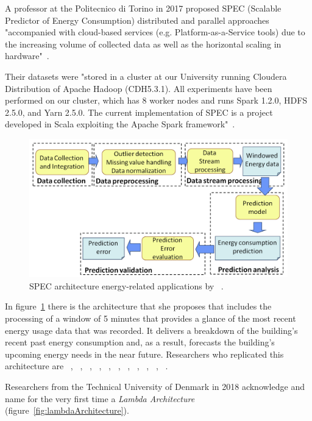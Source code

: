 \documentclass[a4paper,12pt,twoside]{ThesisStyle}
\begin{document}
A professor at the Politecnico di Torino in 2017 proposed SPEC (Scalable Predictor of Energy Consumption) distributed and parallel approaches "accompanied with cloud-based services (e.g. Platform-as-a-Service tools) due to the increasing volume of collected data as well as the horizontal scaling in hardware"~\cite{cerquitelli2017predicting}. 

Their datasets were "stored in a cluster at our University running Cloudera Distribution of Apache Hadoop (CDH5.3.1). All experiments have been performed on our cluster, which has 8 worker nodes and runs Spark 1.2.0, HDFS 2.5.0, and Yarn 2.5.0. The current implementation of SPEC is a project developed in Scala exploiting the Apache Spark framework"~\cite{cerquitelli2017predicting}. 

\begin{figure}[]
\centering
\includegraphics[width=13 cm]{imatges/SPECarchitecture.png}
\caption{\label{fig:SPECarchitecture} SPEC architecture energy-related applications by ~\cite{cerquitelli2017predicting}.}
\end{figure}

In figure~\ref{fig:SPECarchitecture} there is the architecture that she proposes that includes the processing of a window of 5 minutes that provides a glance of the most recent energy usage data that was recorded. It delivers a breakdown of the building's recent past energy consumption and, as a result, forecasts the building's upcoming energy needs in the near future. Researchers who replicated this architecture are ~\cite{Wang2017Taxis}, ~\cite{liu2018scalable}, ~\cite{bangui2021hybrid}, ~\cite{leiria2021using}, ~\cite{abd2022analyze}, ~\cite{ali2020data}, ~\cite{hangan2022advanced}, ~\cite{saheed2022machine}, ~\cite{bukhari2023anomaly}, ~\cite{yadav2023augmentation}, ~\cite{wu2023gtfs}.

Researchers from the Technical University of Denmark in 2018 acknowledge and name for the very first time a \textit{Lambda Architecture} (figure~\ref{fig:lambdaArchitecture}).
\end{document}
